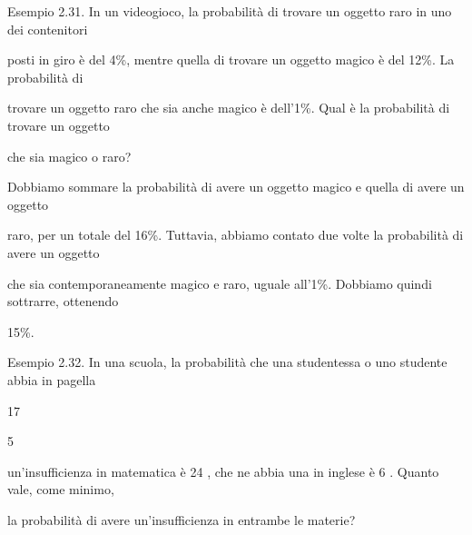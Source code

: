 \documentclass[a4paper,portrait,12pt]{article}
\begin{document}
\begin{flushleft}
Esempio 2.31. In un videogioco, la probabilit\`{a} di trovare un oggetto raro in uno dei contenitori
\end{flushleft}


\begin{flushleft}
posti in giro \`{e} del 4\%, mentre quella di trovare un oggetto magico \`{e} del 12\%. La probabilit\`{a} di
\end{flushleft}


\begin{flushleft}
trovare un oggetto raro che sia anche magico \`{e} dell'1\%. Qual \`{e} la probabilit\`{a} di trovare un oggetto
\end{flushleft}


\begin{flushleft}
che sia magico o raro?
\end{flushleft}


\begin{flushleft}
Dobbiamo sommare la probabilit\`{a} di avere un oggetto magico e quella di avere un oggetto
\end{flushleft}


\begin{flushleft}
raro, per un totale del 16\%. Tuttavia, abbiamo contato due volte la probabilit\`{a} di avere un oggetto
\end{flushleft}


\begin{flushleft}
che sia contemporaneamente magico e raro, uguale all'1\%. Dobbiamo quindi sottrarre, ottenendo
\end{flushleft}


15\%.


\begin{flushleft}
Esempio 2.32. In una scuola, la probabilit\`{a} che una studentessa o uno studente abbia in pagella
\end{flushleft}


17


5


\begin{flushleft}
un'insufficienza in matematica \`{e} 24 , che ne abbia una in inglese \`{e} 6 . Quanto vale, come minimo,
\end{flushleft}


\begin{flushleft}
la probabilit\`{a} di avere un'insufficienza in entrambe le materie?
\end{flushleft}
\end{document}
